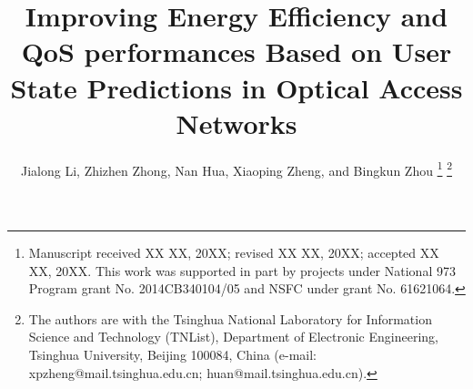 \documentclass[journal]{IEEEtran}
\begin{document}
%
\title{\textbf{Improving Energy Efficiency and QoS performances Based on User State Predictions in Optical Access Networks}}
%
%
%

\author{Jialong Li, Zhizhen Zhong, Nan Hua, Xiaoping Zheng, and Bingkun Zhou%
\thanks{Manuscript received XX XX, 20XX; revised XX XX, 20XX; accepted XX XX, 20XX. This work was supported in part by projects under National 973 Program grant No. 2014CB340104/05 and NSFC under grant No. 61621064.}
\thanks{The authors are with the Tsinghua National Laboratory for Information Science and Technology (TNList), Department of Electronic Engineering, Tsinghua University, Beijing 100084, China (e-mail: xpzheng@mail.tsinghua.edu.cn; huan@mail.tsinghua.edu.cn).}}

% 
%
\end{document}
